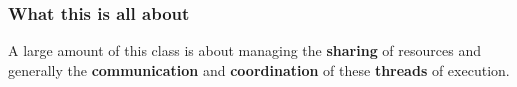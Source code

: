 \documentclass[xcolor={dvipsnames,svgnames},aspectratio=169]{beamer}
\begin{document}





\begin{frame}[fragile]
  \frametitle{What this is all about}

  \large{A large amount of this class is about managing the \textbf{sharing} of resources
  and generally the \textbf{communication} and \textbf{coordination} of these
  \textbf{threads} of execution. }
\end{frame}
\end{document}
